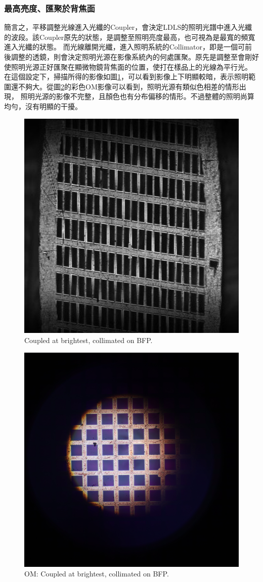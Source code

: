 \documentclass[12pt]{article}
\begin{document}
    \subsubsection{最高亮度、匯聚於背焦面} \label{section: illuOriginal}
    簡言之，平移調整光線進入光纖的Coupler，會決定LDLS的照明光譜中進入光纖的波段。該Coupler原先的狀態，是調整至照明亮度最高，也可視為是最寬的頻寬進入光纖的狀態。
    而光線離開光纖，進入照明系統的Collimator，即是一個可前後調整的透鏡，則會決定照明光源在影像系統內的何處匯聚。原先是調整至會剛好使照明光源正好匯聚在顯微物鏡背焦面的位置，使打在樣品上的光線為平行光。
    在這個設定下，掃描所得的影像如圖\ref{figure: brightest_on}，可以看到影像上下明顯較暗，表示照明範圍還不夠大。從圖\ref{figure: om_brightest_on}的彩色OM影像可以看到，照明光源有類似色相差的情形出現，
    照明光源的影像不完整，且顏色也有分布偏移的情形。不過整體的照明尚算均勻，沒有明顯的干擾。
    \begin{figure}[t]
        \centering
        \includegraphics[width=0.5\linewidth]{on_brightest.jpg}
        \caption{Coupled at brightest, collimated on BFP.}
        \label{figure: brightest_on}
    \end{figure}
    \begin{figure}[t]
        \centering
        \includegraphics[width=0.5\linewidth]{om_on_brightest.JPG}
        \caption{OM: Coupled at brightest, collimated on BFP.}
        \label{figure: om_brightest_on}
    \end{figure}
\end{document}
